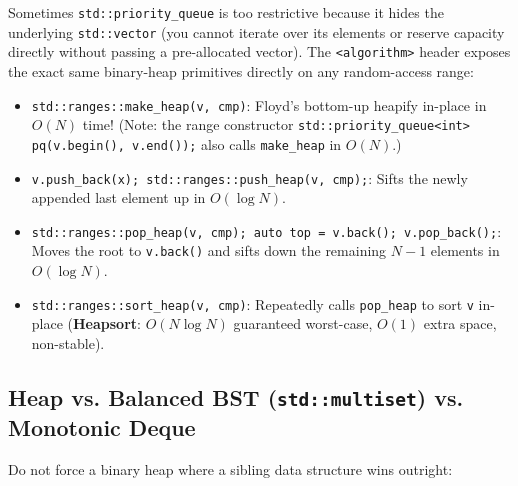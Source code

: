 \documentclass[11pt,a4paper]{article}
\theoremstyle{definition}
\begin{document}
Sometimes \texttt{std::priority\_queue} is too restrictive because it hides the underlying \texttt{std::vector} (you cannot iterate over its elements or reserve capacity directly without passing a pre-allocated vector). The \texttt{<algorithm>} header exposes the exact same binary-heap primitives directly on any random-access range:
\begin{itemize}
    \item \texttt{std::ranges::make\_heap(v, cmp)}: Floyd's bottom-up heapify in-place in \textbf{$O(N)$} time! (Note: the range constructor \texttt{std::priority\_queue<int> pq(v.begin(), v.end());} also calls \texttt{make\_heap} in $O(N)$.)
    \item \texttt{v.push\_back(x); std::ranges::push\_heap(v, cmp);}: Sifts the newly appended last element up in $O(\log N)$.
    \item \texttt{std::ranges::pop\_heap(v, cmp); auto top = v.back(); v.pop\_back();}: Moves the root to \texttt{v.back()} and sifts down the remaining $N - 1$ elements in $O(\log N)$.
    \item \texttt{std::ranges::sort\_heap(v, cmp)}: Repeatedly calls \texttt{pop\_heap} to sort \texttt{v} in-place (\textbf{Heapsort}: $O(N \log N)$ guaranteed worst-case, $O(1)$ extra space, non-stable).
\end{itemize}

\subsection{Heap vs. Balanced BST (\texttt{std::multiset}) vs. Monotonic Deque}

Do not force a binary heap where a sibling data structure wins outright:
\end{document}
